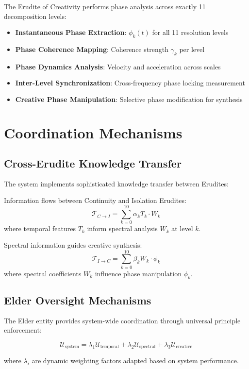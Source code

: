 The Erudite of Creativity performs phase analysis across exactly 11 decomposition levels:
\begin{itemize}
    \item \textbf{Instantaneous Phase Extraction}: $\phi_k(t)$ for all 11 resolution levels
    \item \textbf{Phase Coherence Mapping}: Coherence strength $\gamma_k$ per level
    \item \textbf{Phase Dynamics Analysis}: Velocity and acceleration across scales
    \item \textbf{Inter-Level Synchronization}: Cross-frequency phase locking measurement
    \item \textbf{Creative Phase Manipulation}: Selective phase modification for synthesis
\end{itemize}

\section{Coordination Mechanisms}

\subsection{Cross-Erudite Knowledge Transfer}

The system implements sophisticated knowledge transfer between Erudites:

\begin{definition}
Information flows between Continuity and Isolation Erudites:
\begin{equation}
\mathcal{T}_{C \rightarrow I} = \sum_{k=0}^{10} \alpha_k T_k \cdot W_k
\end{equation}
where temporal features $T_k$ inform spectral analysis $W_k$ at level $k$.
\end{definition}

\begin{definition}
Spectral information guides creative synthesis:
\begin{equation}
\mathcal{T}_{I \rightarrow C} = \sum_{k=0}^{10} \beta_k W_k \cdot \phi_k
\end{equation}
where spectral coefficients $W_k$ influence phase manipulation $\phi_k$.
\end{definition}

\subsection{Elder Oversight Mechanisms}

The Elder entity provides system-wide coordination through universal principle enforcement:

\begin{equation}
\mathcal{U}_{\text{system}} = \lambda_1 \mathcal{U}_{\text{temporal}} + \lambda_2 \mathcal{U}_{\text{spectral}} + \lambda_3 \mathcal{U}_{\text{creative}}
\end{equation}

where $\lambda_i$ are dynamic weighting factors adapted based on system performance.